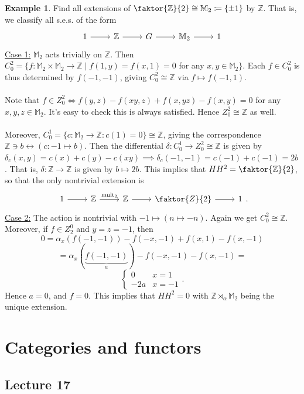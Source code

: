 \documentclass[10pt,letterpaper,cm]{nupset}
\theoremstyle{definition}
\newtheorem{exmp}[definition]{Example}
\theoremstyle{theorem}
\theoremstyle{remark}
\newcommand{\M}{\mathbb M}
\newcommand{\Z}{\mathbb Z}
\newcommand{\1}{\mathbf{1}}
\newcommand{\0}{\vec 0}
\begin{document}
\begin{exmp}
Find all extensions of $\faktor{\Z}{2}\cong \M_2 \coloneqq  \{\pm1\}$ by $\Z$. That is, we classify all s.e.s. of the form
\[
\begin{tikzcd}
1 \arrow[r] & \Z \arrow[r] & G \arrow[r] & \M_2 \arrow[r] & 1
\end{tikzcd}
\]
\underline{Case 1:} $\M_2$ acts trivially on $\Z$. Then $C^2_0 = \{f : \M_2 \times \M_2 \to \Z \mid f(1, y) = f(x, 1) = 0$ for any $x,y \in \M_2 \}$. Each $f \in C^2_0$ is thus determined by $f(-1, -1)$, giving $C^2_0 \cong \Z$ via $f\mapsto f(-1, 1)$.
\\ \\ Note that $f\in Z^2_0 \iff f(y, z)-f(xy, z)+f(x, yz)-f(x, y) =0$ for any $x, y, z\in \M_2$. It's easy to check this is always satisfied. Hence $Z^2_0 \cong \Z$ as well. 
\\ \\ Moreover, $C^1_0 = \{c : \M_2 \to \Z : c(1) =0\} \cong \Z$, giving the correspondence $\Z \ni b \longleftrightarrow (c: -1 \mapsto b)$. Then the differential $\delta : C^1_0 \to Z^2_0\cong \Z$ is given by $\delta_c(x, y) = c(x)+c(y) -c(xy)\implies \delta_c(-1, -1) = c(-1) + c(-1) = 2b$. That is, $\delta : \Z \to \Z$ is given by $b \mapsto 2b$. This implies that $HH^2 = \faktor{\Z}{2}$, so that the only nontrivial extension is
\[
\begin{tikzcd}
1 \arrow[r] & \Z \arrow[r, "\text{mult}_2"] & \Z \arrow[r] & \faktor{Z}{2} \arrow[r] & 1
\end{tikzcd}.
\]
\underline{Case 2:} The action is nontrivial with $-1 \mapsto (n \mapsto -n)$.  Again we get $C^2_0 \cong \Z$. Moreover, if $f\in Z_2^0$ and $y= z = -1$, then $$0 = \alpha_x(f(-1, -1)) - f(-x, -1)+ f(x, 1)- f(x, -1)$$ $$= \alpha_x(\underbrace{f(-1, -1)}_a) - f(-x, -1)- f(x, -1) = $$
\[
\begin{cases}
0 & x =1 \\
-2a & x = -1
\end{cases}.
\]
Hence $a = 0$, and $f = 0$. This implies that $HH^2 = 0$ with $\Z \rtimes_{\alpha} \M_2$ being the unique extension. 
\end{exmp}

\section{Categories and functors}

\subsection{Lecture 17}
\end{document}
